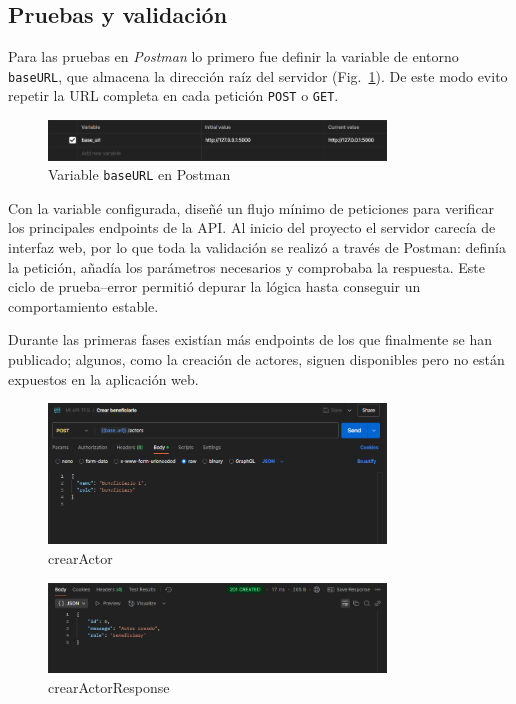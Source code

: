 \subsection{Pruebas y validación}
\label{subsubsec:PruebasValidacion}
Para las pruebas en \emph{Postman} lo primero fue definir la variable de entorno
\texttt{baseURL}, que almacena la dirección raíz del servidor
(Fig.~\ref{fig:baseURL}).  
De este modo evito repetir la URL completa en cada petición \texttt{POST} o
\texttt{GET}.

\begin{figure}[H]
  \centering
  \includegraphics[width=0.8\textwidth]{Imagenes/baseURL.png}
  \caption{Variable \texttt{baseURL} en Postman}
  \label{fig:baseURL}
\end{figure}
Con la variable configurada, diseñé un flujo mínimo de peticiones para
verificar los principales endpoints de la API.  
Al inicio del proyecto el servidor carecía de interfaz web, por lo que toda la
validación se realizó a través de Postman: definía la petición, añadía los
parámetros necesarios y comprobaba la respuesta.  
Este ciclo de prueba–error permitió depurar la lógica hasta conseguir un
comportamiento estable.

Durante las primeras fases existían más endpoints de los que finalmente se han
publicado; algunos, como la creación de actores, siguen disponibles pero no
están expuestos en la aplicación web.

\begin{figure}[H]
  \centering
  \includegraphics[width=0.8\textwidth]{Imagenes/crearActor.png}
  \caption{crearActor}
  \label{fig:crearActor}
\end{figure}

\begin{figure}[H]
  \centering
  \includegraphics[width=0.8\textwidth]{Imagenes/crearActorResponse.png}
  \caption{crearActorResponse}
  \label{fig:crearActorResponse}
\end{figure}

